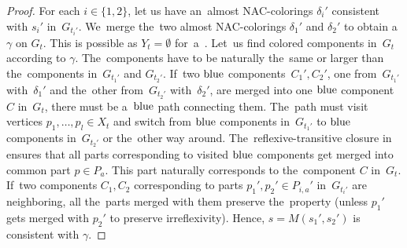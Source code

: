 %
\begin{proof}
	For each \( i \in \{1, 2\} \),
	let us have an~almost NAC-colorings \( \delta_i' \) consistent with
	\( s_i' \) in~\( G_{t_i'} \).
	We~merge the~two almost NAC-colorings \( \delta_1' \) and \( \delta_2' \)
	to obtain a~\rbcol{} \( \gamma \) on \( G_t \).
	This is possible as \( Y_t = \emptyset \) for~a~\JoinNode{}.
	Let~us find colored components in~\( G_t \) according to \(	\gamma \).
	The~components have to be naturally the~same or larger
	than the~components in~\( G_{t_1'} \) and \( G_{t_2'} \).
	If~two \( \text{blue} \) components~\( C_1', C_2' \),
	one from~\( G_{t_1'} \) with~\( \delta_1' \) and
	the~other from~\( G_{t_2'} \) with~\( \delta_2' \),
	are merged into one \( \text{blue} \) component \( C \) in~\( G_t \),
	there must be a~\( \text{blue} \) path connecting them.
	The~path must visit vertices \( p_1, \dots, p_l \in X_t \)
	and switch from \( \text{blue} \) components in~\( G_{t_1'} \)
	to \( \text{blue} \) components in~\( G_{t_2'} \) or the~other way around.
	The~reflexive-transitive closure in~
	ensures that all parts corresponding to visited \( \text{blue} \) components
	get merged into common part \( p \in P_a \).
	This part naturally corresponds to the~component \( C \) in~\( G_t \).
	If~two components \( C_1, C_2 \) corresponding to
	parts \( p_1', p_2' \in P_{i,a}' \) in~\( G_{t_i'} \) are neighboring,
	all the~parts merged with them preserve the~property
	(unless \( p_1' \) gets merged with \( p_2' \) to preserve irreflexivity).
	Hence, \( s = M(s_1', s_2') \) is consistent with \( \gamma \).
\end{proof}

